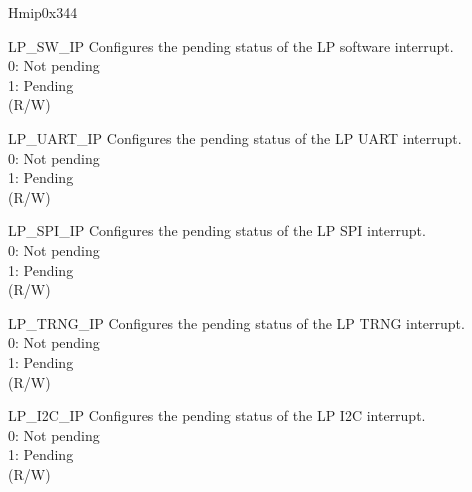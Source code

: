 \begin{register}{H}{mip}{0x344}\label{regdesc:LPMIP}
%
%
%
%
%
%
%
%
%
%
%
%
%
%
%
%
%
%
%
%
%
%
%
\regnewline%
\begin{regdesc}\begin{reglist}
\label{fielddesc:LPMIPLPSWIP}\item [LP\_SW\_IP] Configures the pending status of the LP software interrupt.\\
0: Not pending\\
1: Pending\\
(R/W)
\label{fielddesc:LPMIPLPUARTIP}\item [LP\_UART\_IP] Configures the pending status of the LP UART interrupt. \\
0: Not pending\\
1: Pending \\(R/W)
\label{fielddesc:LPMIPLPSPIIP}\item [LP\_SPI\_IP] Configures the pending status of the LP SPI interrupt.\\
0: Not pending\\
1: Pending \\(R/W)
\label{fielddesc:LPMIPLPTRNGIP}\item [LP\_TRNG\_IP] Configures the pending status of the LP TRNG interrupt.\\
0: Not pending\\
1: Pending\\ (R/W)
\label{fielddesc:LPMIPI2CIP}\item [LP\_I2C\_IP] Configures the pending status of the LP I2C interrupt.\\
0: Not pending\\
1: Pending \\(R/W)

\end{reglist}
\end{regdesc}
\end{register}
